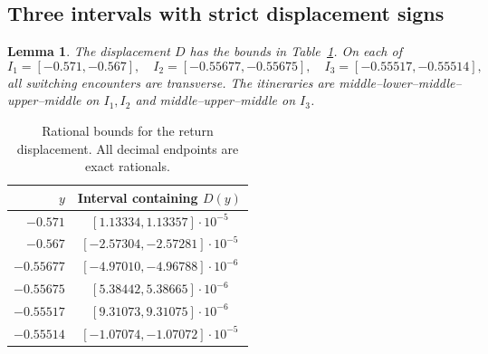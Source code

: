 \documentclass[11pt,a4paper]{article}
\newtheorem{lemma}{Lemma}
\begin{document}
\subsection{Three intervals with strict displacement signs}
\begin{lemma}\label{lem:bounds}
The displacement $D$ has the bounds in Table~\ref{tab:signs}.
On each of
\begin{equation}\label{eq:intervals}
 I_1=[-0.571,-0.567],\quad
 I_2=[-0.55677,-0.55675],\quad
 I_3=[-0.55517,-0.55514],
\end{equation}
all switching encounters are transverse. The itineraries are
middle--lower--middle--upper--middle on $I_1,I_2$ and
middle--upper--middle on $I_3$.
\end{lemma}
\begin{table}[ht]
\centering
\caption{Rational bounds for the return displacement. All decimal endpoints are exact rationals.}\label{tab:signs}
\begin{tabular}{@{}rc@{}}\toprule
$y$ & Interval containing $D(y)$\\\midrule
$-0.571$ & $[1.13334,1.13357]\cdot10^{-5}$\\
$-0.567$ & $[-2.57304,-2.57281]\cdot10^{-5}$\\
$-0.55677$ & $[-4.97010,-4.96788]\cdot10^{-6}$\\
$-0.55675$ & $[5.38442,5.38665]\cdot10^{-6}$\\
$-0.55517$ & $[9.31073,9.31075]\cdot10^{-6}$\\
$-0.55514$ & $[-1.07074,-1.07072]\cdot10^{-5}$\\\bottomrule
\end{tabular}
\end{table}
\end{document}
